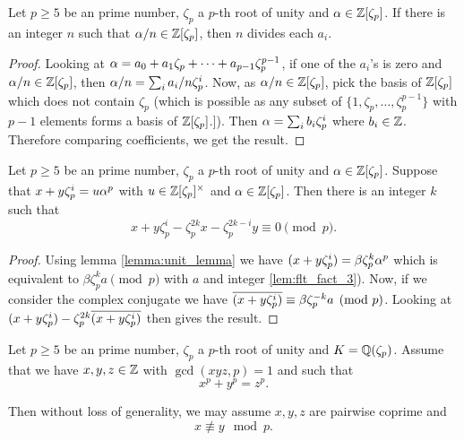 \begin{lemma}\label{lem:flt_fact_4}
	\leanok
	Let $p \geq 5$ be an prime number, $\zeta_p$ a $p$-th root of unity and $ \alpha \in \mathbb{Z}[\zeta_p]$. If there is an integer $n$ such that $\alpha/n \in \mathbb{Z}[\zeta_p]$, then $n$ divides each $a_i$.
\end{lemma}
\begin{proof}
	 Looking at $\alpha=a_0+a_1\zeta_p+\cdots+a_{p-1}\zeta_p^{p-1}$, if one of the $a_i$'s is zero and $\alpha/n \in \mathbb{Z}[\zeta_p]$, then $\alpha/n=\sum_i a_i/n \zeta_p^i$. Now, as $\alpha/n \in \mathbb{Z}[\zeta_p]$, pick the basis of $\mathbb{Z}[\zeta_p]$ which does not contain $\zeta_p$ (which is possible as any subset of $\{1,\zeta_p,\dots,\zeta_p^{p-1}\}$ with $p-1$ elements forms a basis of $\mathbb{Z}[\zeta_p]$.]). Then $\alpha=\sum_i b_i \zeta_p^i$ where $b_i \in \mathbb{Z}$. Therefore comparing coefficients, we get the result.
\end{proof}

\begin{lemma}\label{lem:flt_fact_5}
	\leanok
	Let $p \geq 5$ be an prime number, $\zeta_p$ a $p$-th root of unity and $ \alpha \in \mathbb{Z}[\zeta_p]$.  Suppose that $x+y\zeta_p^i=u \alpha^p$ with $u \in \mathbb{Z}[\zeta_p]^\times$ and $\alpha \in \mathbb{Z}[\zeta_p]$. Then there is an integer $k$ such that \[x+y\zeta_p^i-\zeta_p^{2k}x-\zeta_p^{2k-i}y \equiv 0 \pmod p.\]
\end{lemma}
\begin{proof}
 Using lemma \ref{lemma:unit_lemma} we have $(x+y\zeta_p^i) =\beta \zeta_p^k \alpha^p$ which is equivalent to $\beta \zeta_p^k a \pmod p$ with $a$ and integer \ref{lem:flt_fact_3}). Now, if we consider the complex conjugate we have $\overline{(x+y\zeta_p^i)  }\equiv \beta \zeta_p^{-k}a \pmod p$. Looking at $(x+y\zeta_p^i)-\zeta_p^{2k}\overline{(x+y\zeta_p^i)  }$ then gives the result.
\end{proof}

\begin{lemma}\label{lemma:may_assume}

	Let $p \geq 5$ be an prime number, $\zeta_p$ a $p$-th root of unity and $K=\mathbb{Q}(\zeta_p)$.  Assume that we have $x,y,z \in \mathbb{Z}$ with $\gcd(xyz,p)=1$ and such that \[x^p+y^p=z^p.\]

Then without loss of generality, we may assume $x,y,z$ are pairwise coprime and \[x \not \equiv y \mod p.\]
\end{lemma}



